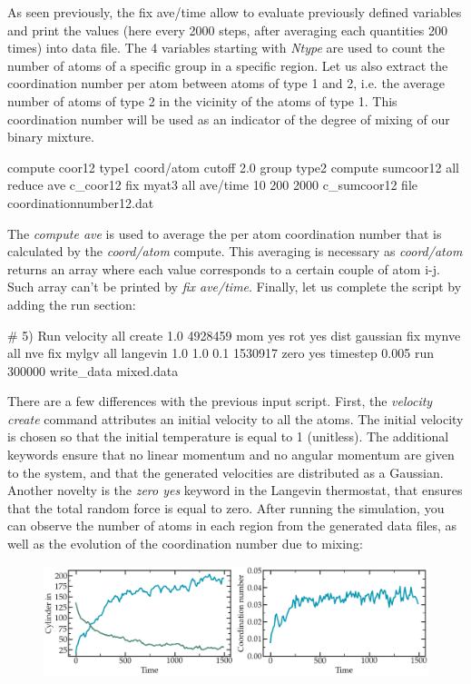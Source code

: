 \noindent As seen previously, the fix ave/time
allow to evaluate previously defined variables and print
the values (here every 2000 steps, after averaging each quantities 200 times)
into data file. The 4 variables starting with \textit{Ntype} are used to count
the number of atoms of a specific group in a specific
region. 
Let us also extract the coordination number per atom between atoms 
of type 1 and 2, i.e. the average number of atoms of type 2 in the vicinity 
of the atoms of type 1. This coordination number will be used as an indicator of the 
degree of mixing of our binary mixture. 

\begin{lcverbatim}
compute coor12 type1 coord/atom cutoff 2.0 group type2
compute sumcoor12 all reduce ave c_coor12
fix myat3 all ave/time 10 200 2000 c_sumcoor12 file coordinationnumber12.dat

\end{lcverbatim}

\noindent The \textit{compute ave} is used to average the per atom
coordination number that is calculated by the \textit{coord/atom} compute.
This averaging is necessary as \textit{coord/atom} returns an array where each value corresponds 
to a certain couple of atom i-j. Such array can't be printed by \textit{fix ave/time}. 
Finally, let us complete the script by adding the run section:

\begin{lcverbatim}
# 5) Run
velocity all create 1.0 4928459 mom yes rot yes dist gaussian
fix mynve all nve
fix mylgv all langevin 1.0 1.0 0.1 1530917 zero yes
timestep 0.005
run 300000
write_data mixed.data
\end{lcverbatim}

\noindent There are a few differences with the
previous input script. First, the \textit{velocity create}
command attributes an initial velocity to all the atoms.
The initial velocity is chosen so that the initial
temperature is equal to 1 (unitless). The additional
keywords ensure that no linear momentum and no angular
momentum are given to the system, and that the generated
velocities are distributed as a Gaussian. Another novelty
is the \textit{zero yes} keyword in the Langevin thermostat, that
ensures that the total random force is equal to zero.
After running the simulation, you can observe the number
of atoms in each region from the generated data files, as
well as the evolution of the coordination number due to
mixing:

\begin{figure}
\includegraphics[width=\linewidth]{tutorials/level0/lennard-jones-fluid/population-light.png}
\end{figure}

